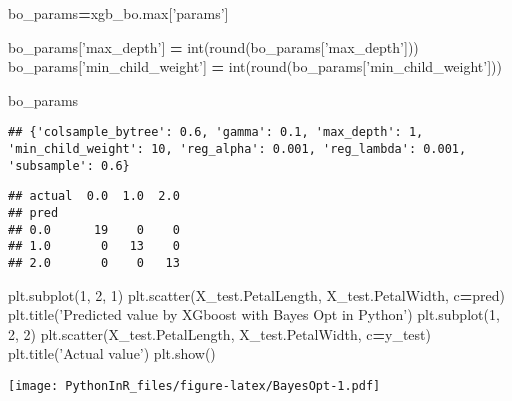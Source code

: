 \documentclass[]{article}
\newenvironment{Shaded}{\begin{snugshade}}{\end{snugshade}}
\newcommand{\BuiltInTok}[1]{#1}
\newcommand{\CommentTok}[1]{\textcolor[rgb]{0.56,0.35,0.01}{\textit{#1}}}
\newcommand{\DecValTok}[1]{\textcolor[rgb]{0.00,0.00,0.81}{#1}}
\newcommand{\FloatTok}[1]{\textcolor[rgb]{0.00,0.00,0.81}{#1}}
\newcommand{\NormalTok}[1]{#1}
\newcommand{\OperatorTok}[1]{\textcolor[rgb]{0.81,0.36,0.00}{\textbf{#1}}}
\newcommand{\StringTok}[1]{\textcolor[rgb]{0.31,0.60,0.02}{#1}}
\begin{document}
\begin{Shaded}
\begin{Highlighting}[]
\NormalTok{bo_params}\OperatorTok{=}\NormalTok{xgb_bo.}\BuiltInTok{max}\NormalTok{[}\StringTok{'params'}\NormalTok{]}

\NormalTok{bo_params[}\StringTok{'max_depth'}\NormalTok{] }\OperatorTok{=} \BuiltInTok{int}\NormalTok{(}\BuiltInTok{round}\NormalTok{(bo_params[}\StringTok{'max_depth'}\NormalTok{]))}
\NormalTok{bo_params[}\StringTok{'min_child_weight'}\NormalTok{] }\OperatorTok{=} \BuiltInTok{int}\NormalTok{(}\BuiltInTok{round}\NormalTok{(bo_params[}\StringTok{'min_child_weight'}\NormalTok{]))}

\NormalTok{bo_params}
\end{Highlighting}
\end{Shaded}

\begin{verbatim}
## {'colsample_bytree': 0.6, 'gamma': 0.1, 'max_depth': 1, 'min_child_weight': 10, 'reg_alpha': 0.001, 'reg_lambda': 0.001, 'subsample': 0.6}
\end{verbatim}

\begin{Shaded}
\end{Shaded}

\begin{verbatim}
## actual  0.0  1.0  2.0
## pred                 
## 0.0      19    0    0
## 1.0       0   13    0
## 2.0       0    0   13
\end{verbatim}

\begin{Shaded}
\begin{Highlighting}[]
\NormalTok{plt.subplot(}\DecValTok{1}\NormalTok{, }\DecValTok{2}\NormalTok{, }\DecValTok{1}\NormalTok{)}
\NormalTok{plt.scatter(X_test.PetalLength, X_test.PetalWidth, c}\OperatorTok{=}\NormalTok{pred)}
\NormalTok{plt.title(}\StringTok{'Predicted value by XGboost with Bayes Opt in Python'}\NormalTok{)}
\NormalTok{plt.subplot(}\DecValTok{1}\NormalTok{, }\DecValTok{2}\NormalTok{, }\DecValTok{2}\NormalTok{)}
\NormalTok{plt.scatter(X_test.PetalLength, X_test.PetalWidth, c}\OperatorTok{=}\NormalTok{y_test)}
\NormalTok{plt.title(}\StringTok{'Actual value'}\NormalTok{)}
\NormalTok{plt.show()}
\end{Highlighting}
\end{Shaded}

\texttt{[image: PythonInR\_files/figure-latex/BayesOpt-1.pdf]}
\end{document}
